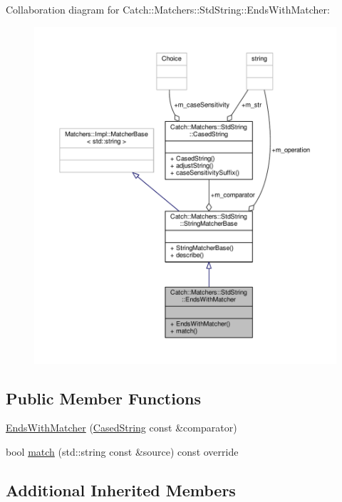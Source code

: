 Collaboration diagram for Catch\-:\-:Matchers\-:\-:Std\-String\-:\-:Ends\-With\-Matcher\-:
\nopagebreak
\begin{figure}[H]
\begin{center}
\leavevmode
\includegraphics[width=350pt]{struct_catch_1_1_matchers_1_1_std_string_1_1_ends_with_matcher__coll__graph}
\end{center}
\end{figure}
\subsection*{Public Member Functions}
\begin{DoxyCompactItemize}
\item 
\hyperlink{struct_catch_1_1_matchers_1_1_std_string_1_1_ends_with_matcher_aa5ec700b4629562f74f362080accfd7b}{Ends\-With\-Matcher} (\hyperlink{struct_catch_1_1_matchers_1_1_std_string_1_1_cased_string}{Cased\-String} const \&comparator)
\item 
bool \hyperlink{struct_catch_1_1_matchers_1_1_std_string_1_1_ends_with_matcher_aca2741fa57374a2a98d2a84ac3e13a6d}{match} (std\-::string const \&source) const override
\end{DoxyCompactItemize}
\subsection*{Additional Inherited Members}


